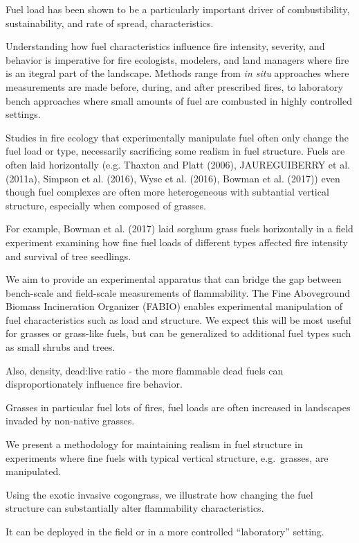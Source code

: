 \documentclass[11pt,a4paper]{article}
\begin{document}
Fuel load has been shown to be a particularly important driver of
combustibility, sustainability, and rate of spread, characteristics.

Understanding how fuel characteristics influence fire intensity,
severity, and behavior is imperative for fire ecologists, modelers, and
land managers where fire is an itegral part of the landscape. Methods
range from \emph{in situ} approaches where measurements are made before,
during, and after prescribed fires, to laboratory bench approaches where
small amounts of fuel are combusted in highly controlled settings.

Studies in fire ecology that experimentally manipulate fuel often only
change the fuel load or type, necessarily sacrificing some realism in
fuel structure. Fuels are often laid horizontally (e.g. Thaxton and
Platt (2006), JAUREGUIBERRY et al. (2011a), Simpson et al. (2016), Wyse
et al. (2016), Bowman et al. (2017)) even though fuel complexes are
often more heterogeneous with subtantial vertical structure, especially
when composed of grasses.

For example, Bowman et al. (2017) laid sorghum grass fuels horizontally
in a field experiment examining how fine fuel loads of different types
affected fire intensity and survival of tree seedlings.

We aim to provide an experimental apparatus that can bridge the gap
between bench-scale and field-scale measurements of flammability. The
Fine Aboveground Biomass Incineration Organizer (FABIO) enables
experimental manipulation of fuel characteristics such as load and
structure. We expect this will be most useful for grasses or grass-like
fuels, but can be generalized to additional fuel types such as small
shrubs and trees.

Also, density, dead:live ratio - the more flammable dead fuels can
disproportionately influence fire behavior.

Grasses in particular fuel lots of fires, fuel loads are often increased
in landscapes invaded by non-native grasses.

We present a methodology for maintaining realism in fuel structure in
experiments where fine fuels with typical vertical structure,
e.g.~grasses, are manipulated.

Using the exotic invasive cogongrass, we illustrate how changing the
fuel structure can substantially alter flammability characteristics.

It can be deployed in the field or in a more controlled ``laboratory''
setting.
\end{document}
